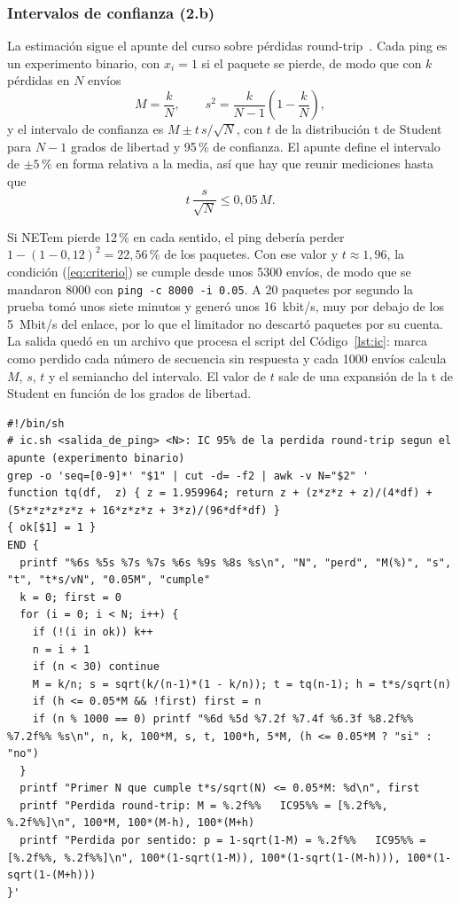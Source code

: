 \documentclass[11pt]{article}
\begin{document}
\subsubsection{Intervalos de confianza (2.b)}

La estimación sigue el apunte del curso sobre pérdidas round-trip~\cite{apunte}. Cada ping es un experimento binario, con $x_i = 1$ si el paquete se pierde, de modo que con $k$ pérdidas en $N$ envíos
\begin{equation}
M = \frac{k}{N}, \qquad s^2 = \frac{k}{N-1}\left(1 - \frac{k}{N}\right),
\end{equation}
y el intervalo de confianza es $M \pm t\,s/\sqrt{N}$, con $t$ de la distribución t de Student para $N-1$ grados de libertad y 95\,\% de confianza. El apunte define el intervalo de $\pm 5$\,\% en forma relativa a la media, así que hay que reunir mediciones hasta que
\begin{equation}
t\,\frac{s}{\sqrt{N}} \le 0{,}05\,M .
\label{eq:criterio}
\end{equation}

Si NETem pierde 12\,\% en cada sentido, el ping debería perder $1 - (1 - 0{,}12)^2 = 22{,}56$\,\% de los paquetes. Con ese valor y $t \approx 1{,}96$, la condición (\ref{eq:criterio}) se cumple desde unos 5300 envíos, de modo que se mandaron 8000 con \texttt{ping -c 8000 -i 0.05}. A 20 paquetes por segundo la prueba tomó unos siete minutos y generó unos 16~kbit/s, muy por debajo de los 5~Mbit/s del enlace, por lo que el limitador no descartó paquetes por su cuenta. La salida quedó en un archivo que procesa el script del Código~\ref{lst:ic}: marca como perdido cada número de secuencia sin respuesta y cada 1000 envíos calcula $M$, $s$, $t$ y el semiancho del intervalo. El valor de $t$ sale de una expansión de la t de Student en función de los grados de libertad.

\begin{lstlisting}[basicstyle=\scriptsize\ttfamily, caption={Script \texttt{ic.sh} que calcula el intervalo de confianza en PC2.}, label=lst:ic]
#!/bin/sh
# ic.sh <salida_de_ping> <N>: IC 95% de la perdida round-trip segun el apunte (experimento binario)
grep -o 'seq=[0-9]*' "$1" | cut -d= -f2 | awk -v N="$2" '
function tq(df,  z) { z = 1.959964; return z + (z*z*z + z)/(4*df) + (5*z*z*z*z*z + 16*z*z*z + 3*z)/(96*df*df) }
{ ok[$1] = 1 }
END {
  printf "%6s %5s %7s %7s %6s %9s %8s %s\n", "N", "perd", "M(%)", "s", "t", "t*s/vN", "0.05M", "cumple"
  k = 0; first = 0
  for (i = 0; i < N; i++) {
    if (!(i in ok)) k++
    n = i + 1
    if (n < 30) continue
    M = k/n; s = sqrt(k/(n-1)*(1 - k/n)); t = tq(n-1); h = t*s/sqrt(n)
    if (h <= 0.05*M && !first) first = n
    if (n % 1000 == 0) printf "%6d %5d %7.2f %7.4f %6.3f %8.2f%% %7.2f%% %s\n", n, k, 100*M, s, t, 100*h, 5*M, (h <= 0.05*M ? "si" : "no")
  }
  printf "Primer N que cumple t*s/sqrt(N) <= 0.05*M: %d\n", first
  printf "Perdida round-trip: M = %.2f%%   IC95%% = [%.2f%%, %.2f%%]\n", 100*M, 100*(M-h), 100*(M+h)
  printf "Perdida por sentido: p = 1-sqrt(1-M) = %.2f%%   IC95%% = [%.2f%%, %.2f%%]\n", 100*(1-sqrt(1-M)), 100*(1-sqrt(1-(M-h))), 100*(1-sqrt(1-(M+h)))
}'
\end{lstlisting}
\end{document}
